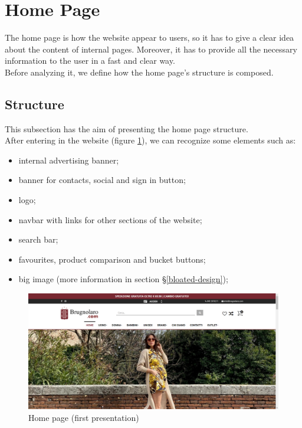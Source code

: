 \section{Home Page}
The home page is how the website appear to users, so it has to give a clear
idea about the content of internal pages. Moreover, it has to provide all
the necessary information to the user in a fast and clear way.\\
Before analyzing it, we define how the home page's structure is composed.

\subsection{Structure}
This subsection has the aim of presenting the home page structure.\\
After entering in the website (figure \ref{home-page-no-scroll}), we can
recognize some elements such as:
\begin{itemize}
    \item internal advertising banner;
    \item banner for contacts, social and sign in button;
    \item logo;
    \item navbar with links for other sections of the website;
    \item search bar;
    \item favourites, product comparison and bucket buttons;
    \item big image (more information in section §\ref{bloated-design});
\end{itemize}
\newpage
\vspace*{\fill}
\begin{figure}[!h] 
    \centering 
    \includegraphics[scale = 0.29]{images/hp_scroll0.png} 
    \caption{Home page (first presentation)}
    \label{home-page-no-scroll}
\end{figure}
